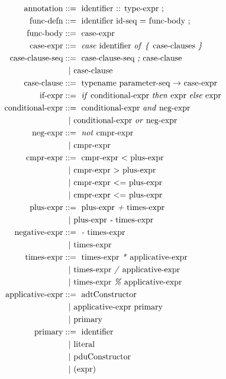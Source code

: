 \begin{align*}
  \textnormal{annotation} &::=~ \textnormal{identifier :: type-expr ;}\\
  \textnormal{func-defn} &::=~ 
    \textnormal{identifier id-seq = func-body ;}\\
  \textnormal{func-body} &::=~ \textnormal{case-expr} \\
  \textnormal{case-expr} &::=~  \textnormal{\emph{case} identifier \emph{of} \emph{\{} case-clauses \emph{\}}}\\
  \textnormal{case-clause-seq} &::=~  \textnormal{case-clause-seq \emph{;} case-clause}\\
    &~~|~ \textnormal{case-clause}\\
  \textnormal{case-clause} &::=~ 
    \textnormal{typename parameter-seq $\rightarrow$ case-expr}\\
  \textnormal{if-expr} &::=~ 
    \textnormal{\emph{if} conditional-expr \emph{then} expr \emph{else} expr}\\
  \textnormal{conditional-expr} &::=~ 
    \textnormal{conditional-expr \emph{and} neg-expr}\\
    &~~|~ \textnormal{conditional-expr \emph{or}  neg-expr}\\
  \textnormal{neg-expr} &::=~ 
    \textnormal{\emph{not} cmpr-expr}\\
    &~~|~ \textnormal{cmpr-expr}\\
  \textnormal{cmpr-expr} &::=~ 
    \textnormal{cmpr-expr $<$ plus-expr}\\
    &~~|~ \textnormal{cmpr-expr $>$ plus-expr}\\
    &~~|~ \textnormal{cmpr-expr $<=$ plus-expr}\\
    &~~|~ \textnormal{cmpr-expr $<=$ plus-expr}\\
  \textnormal{plus-expr} &::=~ 
    \textnormal{plus-expr \emph{+} times-expr}\\
    &~~|~ \textnormal{plus-expr \emph{-} times-expr}\\
  \textnormal{negative-expr} &::=~ 
    \textnormal{\emph{-} times-expr}\\
    &~~|~ \textnormal{times-expr}\\
  \textnormal{times-expr} &::=~ 
    \textnormal{times-expr \emph{*} applicative-expr}\\
    &~~|~ \textnormal{times-expr \emph{/} applicative-expr}\\
    &~~|~ \textnormal{times-expr \emph{\%} applicative-expr}\\
  \textnormal{applicative-expr} &::=~ 
    \textnormal{adtConstructor}\\
    &~~|~ \textnormal{applicative-expr primary}\\
    &~~|~ \textnormal{primary}\\
  \textnormal{primary} &::=~ 
    \textnormal{identifier}\\
    &~~|~ \textnormal{literal}\\
    &~~|~ \textnormal{pduConstructor}\\
    &~~|~ \textnormal{(expr)}
\end{align*}

